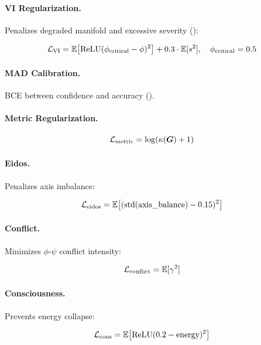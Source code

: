 \paragraph{VI Regularization.}
Penalizes degraded manifold and excessive severity ():

\begin{equation}
    \mathcal{L}_{\text{VI}} = \mathbb{E}\big[\text{ReLU}(\phi_{\text{critical}} - \phi)^2\big] + 0.3 \cdot \mathbb{E}[s^2], \quad \phi_{\text{critical}} = 0.5
\end{equation}

\paragraph{MAD Calibration.}
BCE between confidence and accuracy ().

\paragraph{Metric Regularization.}
\begin{equation}
    \mathcal{L}_{\text{metric}} = \log(\kappa(\bm{G}) + 1)
\end{equation}

\paragraph{Eidos.}
Penalizes axis imbalance:

\begin{equation}
    \mathcal{L}_{\text{eidos}} = \mathbb{E}\big[(\text{std}(\text{axis\_balance}) - 0.15)^2\big]
\end{equation}

\paragraph{Conflict.}
Minimizes $\phi$-$\psi$ conflict intensity:

\begin{equation}
    \mathcal{L}_{\text{conflict}} = \mathbb{E}[\gamma^2]
\end{equation}

\paragraph{Consciousness.}
Prevents energy collapse:

\begin{equation}
    \mathcal{L}_{\text{cons}} = \mathbb{E}\big[\text{ReLU}(0.2 - \text{energy})^2\big]
\end{equation}

